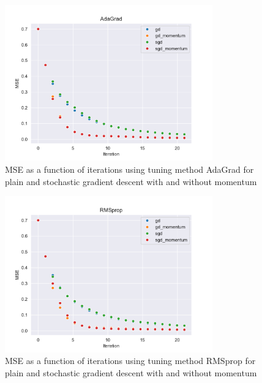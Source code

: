 \begin{figure}[H]
\centering
\includegraphics[width=0.8\textwidth]{Figures/PartA/AdaGradMSE(iter).pdf}
\caption{MSE as a function of iterations using tuning method AdaGrad for plain and stochastic gradient descent with and without momentum}
\label{fig:AdaGradMSE-iter-pdf}
\end{figure}

\begin{figure}[H]
\centering
\includegraphics[width=0.8\textwidth]{Figures/PartA/RMSpropMSE(iter).pdf}
\caption{MSE as a function of iterations using tuning method RMSprop for plain and stochastic gradient descent with and without momentum}
\label{fig:RMSpropMSE-iter-pdf}
\end{figure}

